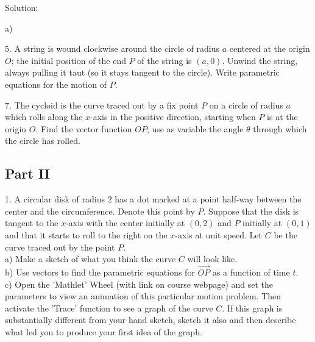 \documentclass{article}
\begin{document}
Solution:

a) 

\bigskip

5. A string is wound clockwise around the circle of radius $a$ centered at the 
origin $O$; the initial position of the end $P$ of the string is $(a, 0)$. 
Unwind the string, always pulling it taut (so it stays tangent to the circle). 
Write parametric equations for the motion of $P$.

\bigskip

7. The cycloid is the curve traced out by a fix point $P$ on a circle of radius 
$a$ which rolls along the $x$-axis in the positive direction, starting when $P$ 
is at the origin $O$. Find the vector function $OP$; use as variable the angle 
$\theta$ through which the circle has rolled.

\begin{center}
\section*{Part II}
\end{center}

\bigskip

1. A circular disk of radius 2 has a dot marked at a point half-way between the 
center and the circumference. Denote this point by $P$. Suppose that the disk is 
tangent to the $x$-axis with the center initially at $(0, 2)$ and $P$ initially 
at $(0, 1)$ and that it starts to roll to the right on the $x$-axis at unit 
speed. Let $C$ be the curve traced out by the point $P$. \\
a) Make a sketch of what you think the curve $C$ will look like. \\
b) Use vectors to find the parametric equations for $\vec{OP}$ as a function of 
time $t$. \\
c) Open the 'Mathlet' Wheel (with link on course webpage) and set the parameters 
to view an animation of this particular motion problem. Then activate the 
'Trace' function to see a graph of the curve $C$. If this graph is substantially 
different from your hand sketch, sketch it also and then describe what led you 
to produce your first idea of the graph.
\end{document}
